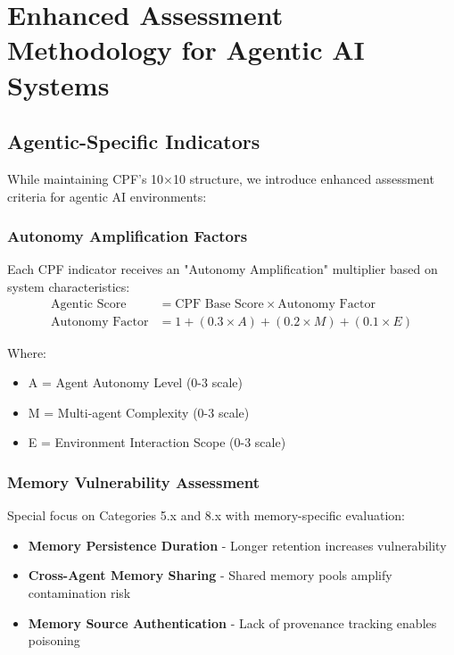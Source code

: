 \documentclass[11pt,a4paper]{article}
\begin{document}
\FloatBarrier

\section{Enhanced Assessment Methodology for Agentic AI Systems}

\subsection{Agentic-Specific Indicators}

While maintaining CPF's 10×10 structure, we introduce enhanced assessment criteria for agentic AI environments:

\subsubsection{Autonomy Amplification Factors}

Each CPF indicator receives an "Autonomy Amplification" multiplier based on system characteristics:
\begin{align}
\text{Agentic Score} &= \text{CPF Base Score} \times \text{Autonomy Factor} \\
\text{Autonomy Factor} &= 1 + (0.3 \times A) + (0.2 \times M) + (0.1 \times E)
\end{align}

Where:
\begin{itemize}
\item A = Agent Autonomy Level (0-3 scale)
\item M = Multi-agent Complexity (0-3 scale)  
\item E = Environment Interaction Scope (0-3 scale)
\end{itemize}

\subsubsection{Memory Vulnerability Assessment}

Special focus on Categories 5.x and 8.x with memory-specific evaluation:
\begin{itemize}
\item \textbf{Memory Persistence Duration} - Longer retention increases vulnerability
\item \textbf{Cross-Agent Memory Sharing} - Shared memory pools amplify contamination risk
\item \textbf{Memory Source Authentication} - Lack of provenance tracking enables poisoning
\end{itemize}
\end{document}
